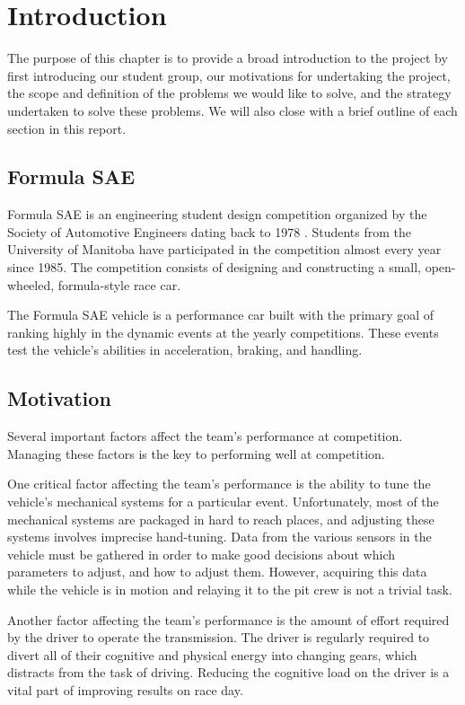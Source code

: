 \chapter{Introduction\label{cha:introduction}}

The purpose of this chapter is to provide a broad introduction to the project by first introducing our student group, our motivations for undertaking the project, the scope and definition of the problems we would like to solve, and the strategy undertaken to solve these problems. We will also close with a brief outline of each section in this report.

\section{Formula SAE}

Formula SAE is an engineering student design competition organized by the Society of Automotive Engineers dating back to 1978 \cite{fsaehistory}. Students from the University of Manitoba have participated in the competition almost every year since 1985. The competition consists of designing and constructing a small, open-wheeled, formula-style race car.

The Formula SAE vehicle is a performance car built with the primary goal of ranking highly in the dynamic events at the yearly competitions. These events test the vehicle's abilities in acceleration, braking, and handling. 

\section{Motivation}

Several important factors affect the team's performance at competition. Managing these factors is the key to performing well at competition.

One critical factor affecting the team's performance is the ability to tune the vehicle's mechanical systems for a particular event. Unfortunately, most of the mechanical systems are packaged in hard to reach places, and adjusting these systems involves imprecise hand-tuning. Data from the various sensors in the vehicle must be gathered in order to make good decisions about which parameters to adjust, and how to adjust them. However, acquiring this data while the vehicle is in motion and relaying it to the pit crew is not a trivial task.

Another factor affecting the team's performance is the amount of effort required by the driver to operate the transmission. The driver is regularly required to divert all of their cognitive and physical energy into changing gears, which distracts from the task of driving. Reducing the cognitive load on the driver is a vital part of improving results on race day.

